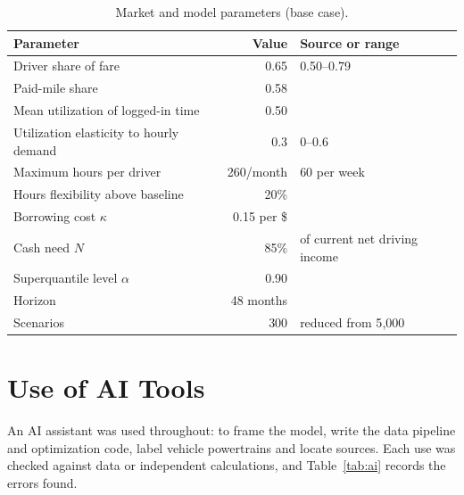 \documentclass[11pt]{article}
\begin{document}
\begin{table}[H]
\centering
\caption{Market and model parameters (base case).}\label{tab:params2}
\small
\begin{tabular}{@{}lrl@{}}
\toprule
Parameter & Value & Source or range \\
\midrule
Driver share of fare & 0.65 & 0.50--0.79 \\
Paid-mile share & 0.58 & \citet{fehrpeers2019} \\
Mean utilization of logged-in time & 0.50 & \citet{cramer2016} \\
Utilization elasticity to hourly demand & 0.3 & 0--0.6 \\
Maximum hours per driver & 260/month & 60 per week \\
Hours flexibility above baseline & 20\% & \\
Borrowing cost $\kappa$ & 0.15 per \$ & \\
Cash need $N$ & 85\% & of current net driving income \\
Superquantile level $\alpha$ & 0.90 & \\
Horizon & 48 months & \\
Scenarios & 300 & reduced from 5{,}000 \\
\bottomrule
\end{tabular}
\end{table}

\section{Use of AI Tools}\label{app:ai}

An AI assistant was used throughout: to frame the model, write the data pipeline and optimization code, label vehicle powertrains and locate sources. Each use was checked against data or independent calculations, and Table~\ref{tab:ai} records the errors found.
\end{document}
